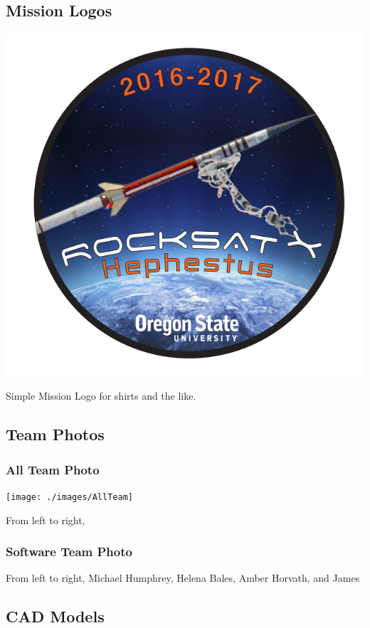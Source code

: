 \subsection{Mission Logos}
\includegraphics[width=\textwidth]{./images/logo}
\begin{center}
Simple Mission Logo for shirts and the like.
\end{center}

\subsection{Team Photos}
\subsubsection{All Team Photo}
\texttt{[image: ./images/AllTeam]}
\begin{center}
From left to right,
\end{center}

\subsubsection{Software Team Photo}
\begin{center}
From left to right, Michael Humphrey, Helena Bales, Amber Horvath, and James
\end{center}

\subsection{CAD Models}
